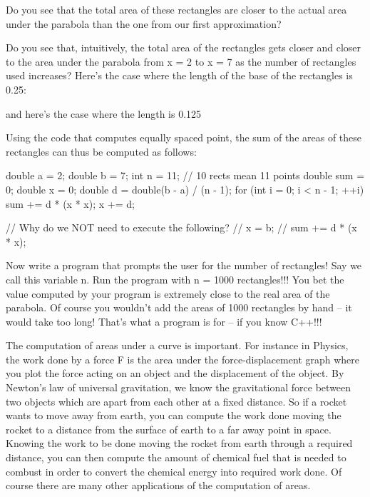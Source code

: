 
Do you see that the total area of these rectangles are closer to the
actual area under the parabola than the one from our first
approximation?

Do you see that, intuitively, the total area of the rectangles gets
closer and closer to the area under the parabola from x = 2 to x = 7 as
the number of rectangles used increases? Here's the case
where the length of the base of the rectangles is 0.25:

and here's the case where the length is 0.125


Using the code that computes equally spaced point, the sum of the areas
of these rectangles can thus be computed as follows:
\begin{console}
double a = 2;
double b = 7;
int n = 11; // 10 rects mean 11 points
double sum = 0;
double x = 0;
double d = double(b - a) / (n - 1);
for (int i = 0; i < n - 1; ++i)
{   
    sum += d * (x * x);
    x += d;
}

// Why do we NOT need to execute the following?
// x = b;
// sum += d * (x * x);
\end{console}

Now write a program that prompts the user for the number of rectangles!
Say we call this variable n. Run the program with n = 1000 rectangles!!!
You bet the value computed by your program is extremely close to the
real area of the parabola. Of course you wouldn't add
the areas of 1000 rectangles by hand -- it would take too long!
That's what a program is for -- if you know C++!!!





The computation of areas under a curve is important. For instance in
Physics, the work done by a force F is the area under the
force-displacement graph where you plot the force acting on an object
and the displacement of the object. By Newton's law of
universal gravitation, we know the gravitational force between two
objects which are apart from each other at a fixed distance. So if a
rocket wants to move away from earth, you can compute the work done
moving the rocket to a distance from the surface of earth to a far away
point in space. Knowing the work to be done moving the rocket from earth
through a required distance, you can then compute the amount of chemical
fuel that is needed to combust in order to convert the chemical energy
into required work done. Of course there are many other applications of
the computation of areas.

